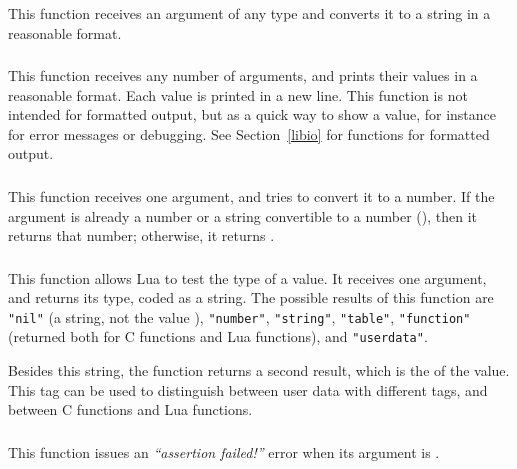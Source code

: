 \subsubsection*{}
This function receives an argument of any type and
converts it to a string in a reasonable format.

\subsubsection*{}
This function receives any number of arguments,
and prints their values in a reasonable format.
Each value is printed in a new line.
This function is not intended for formatted output,
but as a quick way to show a value,
for instance for error messages or debugging.
See Section~\ref{libio} for functions for formatted output.

\subsubsection*{}
This function receives one argument,
and tries to convert it to a number.
If the argument is already a number or a string convertible
to a number (), then it returns that number;
otherwise, it returns \nil.

\subsubsection*{}
This function allows Lua to test the type of a value.
It receives one argument, and returns its type, coded as a string.
The possible results of this function are
\verb'"nil"' (a string, not the value \nil),
\verb'"number"',
\verb'"string"',
\verb'"table"',
\verb'"function"' (returned both for C functions and Lua functions),
and \verb'"userdata"'.

Besides this string, the function returns a second result,
which is the  of the value.
This tag can be used to distinguish between user
data with different tags,
and between C functions and Lua functions.

\subsubsection*{}
This function issues an {\em ``assertion failed!''} error
when its argument is \nil.

